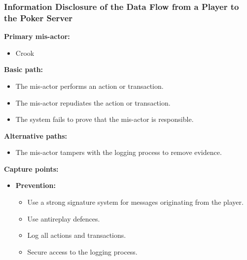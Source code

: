 \documentclass[a4paper,11pt]{report}
\begin{document}
\subsubsection{Information Disclosure of the Data Flow from a Player to the Poker Server}
\textbf{Primary mis-actor:}
\begin{itemize}
\item Crook
\end{itemize}
\textbf{Basic path:}
\begin{itemize}
\item The mis-actor performs an action or transaction.
\item The mis-actor repudiates the action or transaction.
\item The system fails to prove that the mis-actor is responsible.
\end{itemize}
\textbf{Alternative paths:}
\begin{itemize}
\item The mis-actor tampers with the logging process to remove evidence.
\end{itemize}
\textbf{Capture points:}
\begin{itemize}
\item \textbf{Prevention:}
\begin{itemize}
\item Use a strong signature system for messages originating from the player.
\item Use antireplay defences.
\item Log all actions and transactions.
\item Secure access to the logging process.
\end{itemize}
\end{itemize}
\end{document}
